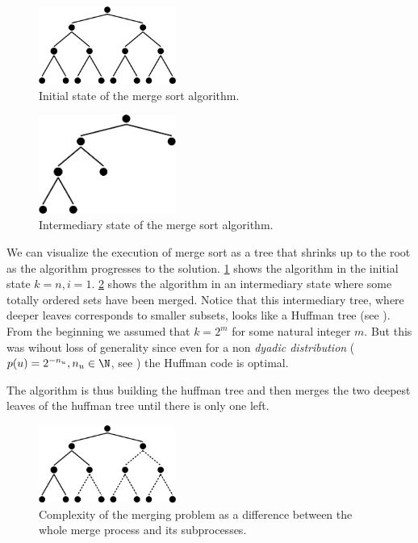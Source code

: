 \begin{figure}
	\centering
	\includegraphics[width=0.4\textwidth]{fig/merging/huffman-1-trim}
	\caption{Initial state of the merge sort algorithm.}
	\label{tree:merging:fig/huffman-1}
\end{figure}

\begin{figure}
	\centering
	\includegraphics[width=0.4\textwidth, bb= 0mm 0mm 131mm 74mm]{fig/merging/huffman-3-trim}
	\caption{Intermediary state of the merge sort algorithm.}
	\label{tree:merging:fig/huffman-3}
\end{figure}

We can visualize the execution of merge sort as a tree that shrinks up to the
root as the algorithm progresses to the solution.
\ref{tree:merging:fig/huffman-1} shows the algorithm in the initial state $k =
n, i = 1$. \ref{tree:merging:fig/huffman-3} shows the algorithm in an
intermediary state where some totally ordered sets have been merged. Notice
that this intermediary tree, where deeper leaves corresponds to smaller
subsets, looks like a Huffman tree (see \cite{huffman1952method}). From the
beginning we assumed that $k = 2^m$ for some natural integer $m$. But this was
wihout loss of generality since even for a non \emph{dyadic distribution}
($p(u) = 2^{-n_u}, n_u \in \N$, see \cite{cover2012elements}) the Huffman code
is optimal.

The algorithm is thus building the huffman tree and then merges the two deepest
leaves of the huffman tree until there is only one left.

\begin{figure}
	\centering
	\includegraphics[width=0.4\textwidth]{fig/merging/huffman-2-trim}
	\caption{Complexity of the merging problem as a difference between the whole merge process and its subprocesses.}
	\label{tree:merging:fig/huffman-2}
\end{figure}

